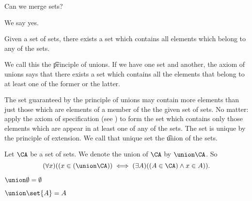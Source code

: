 

Can we merge sets?


We say yes.

\begin{principle}[Union]
	Given a set of sets, there exists a set which contains all elements which belong to any of the sets.	
\end{principle}
We call this the \t{principle of unions}.
If we have one set and another, the axiom of unions says that there exists a set which contains all the elements that belong to at least one of the former or the latter.

The set guaranteed by the principle of unions may contain more elements than just those which are elements of a member of the the given set of sets.
No matter: apply the axiom of specification (see ) to form the set which contains only those elements which are appear in at least one of any of the sets.
The set is unique by the principle of extension.
We call that unique set the \t{union} of the sets.


Let $\CA$ be a set of sets.
We denote the union of $\CA$ by $\union \CA$.
So 
\[
	(\forall x)((x \in (\union\CA)) \iff (\exists A)((A \in \CA) \land x \in A)).
\]


\begin{prop}
$\union \emptyset = \emptyset$
\end{prop}

\begin{prop}
$\union \set{A} = A$
\end{prop}
